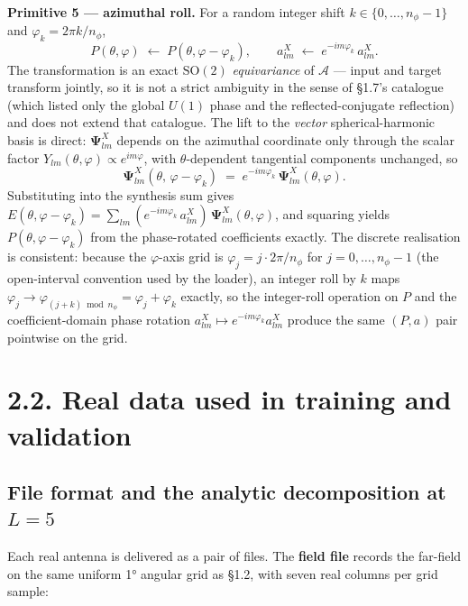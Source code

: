 \documentclass[
  english,
  11pt,
]{report}
\begin{document}
\textbf{Primitive 5 --- azimuthal roll.} For a random integer shift
\(k\in\{0,\dots,n_\phi-1\}\) and \(\varphi_k = 2\pi k / n_\phi\), \[
P(\theta, \varphi)\;\leftarrow\;P(\theta, \varphi - \varphi_k),\qquad a^X_{lm}\;\leftarrow\;e^{-im\varphi_k}\,a^X_{lm}.
\] The transformation is an exact \(\mathrm{SO}(2)\) \emph{equivariance}
of \(\mathcal A\) --- input and target transform jointly, so it is not a
strict ambiguity in the sense of §1.7's catalogue (which listed only the
global \(U(1)\) phase and the reflected-conjugate reflection) and does
not extend that catalogue. The lift to the \emph{vector}
spherical-harmonic basis is direct: \(\boldsymbol\Psi^X_{lm}\) depends
on the azimuthal coordinate only through the scalar factor
\(Y_{lm}(\theta,\varphi)\propto e^{im\varphi}\), with
\(\theta\)-dependent tangential components unchanged, so \[
\boldsymbol\Psi^X_{lm}(\theta,\,\varphi - \varphi_k)\;=\;e^{-im\varphi_k}\,\boldsymbol\Psi^X_{lm}(\theta,\varphi).
\] Substituting into the synthesis sum gives
\(E(\theta,\varphi-\varphi_k) = \sum_{lm}(e^{-im\varphi_k}\,a^X_{lm})\,\boldsymbol\Psi^X_{lm}(\theta,\varphi)\),
and squaring yields \(P(\theta,\varphi-\varphi_k)\) from the
phase-rotated coefficients exactly. The discrete realisation is
consistent: because the \(\varphi\)-axis grid is
\(\varphi_j = j\cdot 2\pi/n_\phi\) for \(j = 0,\dots,n_\phi-1\) (the
open-interval convention used by the loader), an integer roll by \(k\)
maps
\(\varphi_j \to \varphi_{(j+k)\bmod n_\phi} = \varphi_j + \varphi_k\)
exactly, so the integer-roll operation on \(P\) and the
coefficient-domain phase rotation
\(a^X_{lm}\mapsto e^{-im\varphi_k}a^X_{lm}\) produce the same \((P,a)\)
pair pointwise on the grid.

\section{2.2. Real data used in training and
validation}\label{real-data-used-in-training-and-validation}

\subsection{\texorpdfstring{File format and the analytic decomposition
at
\(L = 5\)}{File format and the analytic decomposition at L = 5}}\label{file-format-and-the-analytic-decomposition-at-l-5}

Each real antenna is delivered as a pair of files. The \textbf{field
file} records the far-field on the same uniform 1° angular grid as §1.2,
with seven real columns per grid sample:
\end{document}
